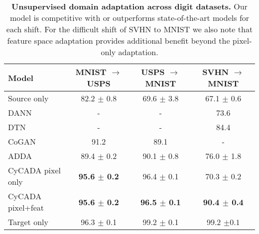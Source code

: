 \begin{table}
  \centering
  \scriptsize
  \setlength{\tabcolsep}{1.35pt}
  \begin{tabular}{lccc}
    \toprule
	Model & 		MNIST $\rightarrow$ USPS & USPS $\rightarrow$ MNIST & SVHN $\rightarrow$ MNIST \\
	\midrule \midrule
	Source only & 	82.2 $\pm$ 0.8 &  69.6 $\pm$ 3.8 &	67.1 $\pm$ 0.6\\
	DANN~\citep{dann}&	-	&	-	&73.6\\
	DTN~\citep{dtn} &	-&		-&	84.4\\
	CoGAN~\citep{cogan} &	91.2 &	89.1 &	-\\
	ADDA~\citep{tzeng_cvpr17} & 	89.4 $\pm$ 0.2 &	90.1 $\pm$ 0.8 &	76.0 $\pm$ 1.8\\
	
        CyCADA pixel only & 	 \bf 95.6 $\pm$ 0.2 &	96.4 $\pm$ 0.1&	70.3 $\pm$ 0.2\\
	CyCADA pixel+feat & 	\bf  95.6 $\pm$ 0.2 & 	\bf	96.5 $\pm$ 0.1 &	\bf	90.4 $\pm$ 0.4\\
	\midrule
	Target only & 	96.3 $\pm$ 0.1 & 	99.2 $\pm$ 0.1&	99.2 $\pm 0.1$\\
    \bottomrule
  \end{tabular}
  \caption{
    \textbf{Unsupervised domain adaptation across digit datasets.} Our model is competitive with or outperforms state-of-the-art models for each shift. For the difficult shift of SVHN to MNIST we also note that feature space adaptation provides additional benefit beyond the pixel-only adaptation. 
    }
  \label{table:digits}
\end{table}
